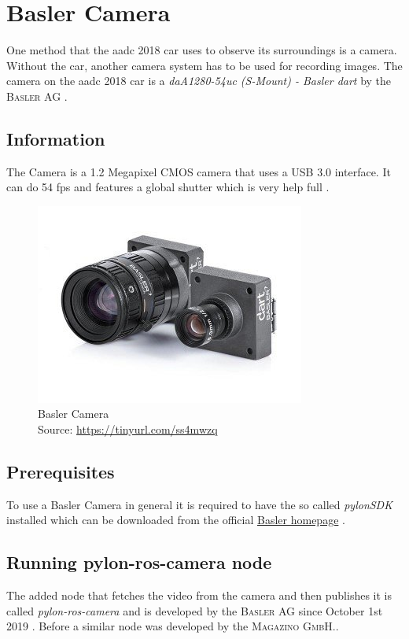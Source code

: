 
\chapter{Basler Camera\authorA}\label{ref:lsdslam}
One method that the \gls{aadc} 2018 car uses to observe its surroundings is a camera. Without the car, another camera system has to be used for recording images. The camera on the \gls{aadc} 2018 car is a \textit{daA1280-54uc (S-Mount) - Basler dart} by the \textsc{Basler AG} \cite{daA12854uc}.

\section{Information}
The Camera is a 1.2 Megapixel CMOS camera that uses a USB 3.0 interface. It can do 54 \gls{fps} and features a global shutter which is very help full \cite{baslerCamera}.
\begin{figure}[h]
	\centering
	\includegraphics[height=0.3\textwidth]{./media/images/Basler-Camera.jpg}
  	\caption{Basler Camera
  	\\Source: \url{https://tinyurl.com/ss4mwzq}}
  	\label{orbslamkittidataset}
\end{figure}

\section{Prerequisites}
To use a Basler Camera in general it is required to have the so called \textit{pylonSDK} installed which can be downloaded from the official \href{https://www.baslerweb.com/de/vertrieb-support/downloads/downloads-software/}{Basler homepage} \cite{pylonsdkdownloadpage}.

\section{Running pylon-ros-camera node}
The added node that fetches the video from the camera and then publishes it is called \textit{pylon-ros-camera} and is developed by the \textsc{Basler AG} since October 1st 2019 \cite{pylonroscamera}. Before a similar node was developed by the \textsc{Magazino GmbH}.\cite{pyloncamera}.

